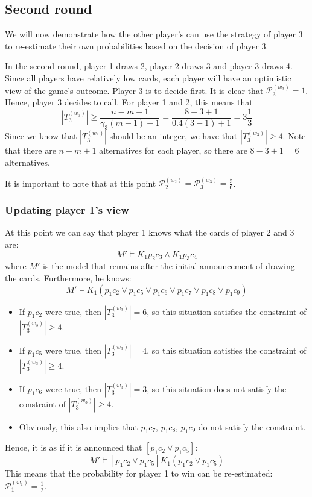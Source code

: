 \documentclass[a4paper,10pt]{article}
\begin{document}
\subsection{Second round}
We will now demonstrate how the other player's can use the strategy of player 3 to re-estimate their own probabilities based on the decision of player 3.

In the second round, player 1 draws 2, player 2 draws 3 and player 3 draws 4. Since all players have relatively low cards, each player will have an optimistic view of the game's outcome. Player 3 is to decide first. It is clear that $\mathcal{P}^{(w_3)}_3=1$. Hence, player 3 decides to call. For player 1 and 2, this means that
\begin{equation*}
 |T_3^{(w_3)}| \geq \frac{n-m+1}{\gamma_3 (m-1)+1} = \frac{8-3+1}{0.4(3-1)+1} = 3\frac{1}{3}
\end{equation*}
Since we know that $|T_3^{(w_3)}|$ should be an integer, we have that $|T_3^{(w_3)}|\geq 4$. Note that there are $n-m+1$ alternatives for each player, so there are $8-3+1=6$ alternatives. 

It is important to note that at this point $\mathcal{P}^{(w_2)}_2 = \mathcal{P}^{(w_3)}_3 = \frac{5}{6}$.

\subsubsection{Updating player 1's view}
At this point we can say that player 1 knows what the cards of player 2 and 3 are: 
\begin{equation*}
M' \models K_1 p_2c_3 \wedge K_1p_3c_4 
\end{equation*}
where $M'$ is the model that remains after the initial announcement of drawing the cards. Furthermore, he knows:
\begin{equation*}
 M' \models K_1(p_1 c_2 \vee p_1 c_5 \vee p_1 c_6 \vee p_1 c_7 \vee p_1 c_8 \vee p_1 c_9)
\end{equation*}
\begin{itemize}
 \item If $p_1 c_2$ were true, then $|T_3^{(w_3)}| = 6$, so this situation satisfies the constraint of $|T_3^{(w_3)}| \geq 4$.
 \item If $p_1 c_5$ were true, then $|T_3^{(w_3)}| = 4$, so this situation satisfies the constraint of $|T_3^{(w_3)}| \geq 4$.
 \item If $p_1 c_6$ were true, then $|T_3^{(w_3)}| = 3$, so this situation does not satisfy the constraint of $|T_3^{(w_3)}| \geq 4$.
 \item Obviously, this also implies that $p_1 c_7$, $p_1 c_8$, $p_1 c_9$ do not satisfy the constraint.   
\end{itemize}
Hence, it is as if it is announced that $[p_1 c_2 \vee p_1 c_5]$:
\begin{equation*}
M'\models [p_1 c_2 \vee p_1 c_5] K_1 (p_1 c_2 \vee p_1 c_5)
\end{equation*}
This means that the probability for player 1 to win can be re-estimated: $\mathcal{P}^{(w_1)}_1 = \frac{1}{2}$.
\end{document}

